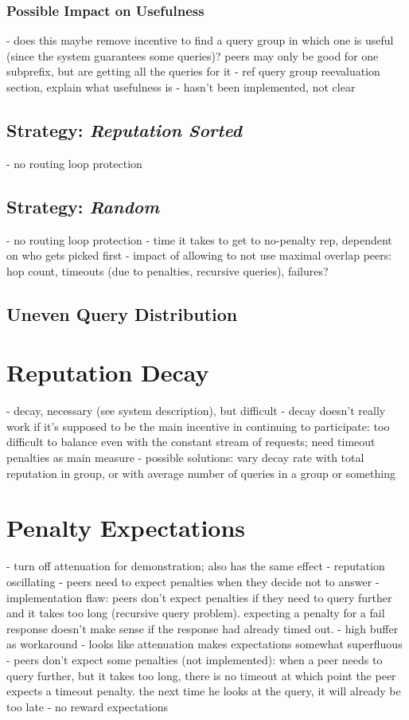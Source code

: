 \subsubsection{Possible Impact on Usefulness}
- does this maybe remove incentive to find a query group in which one is useful
  (since the system guarantees some queries)? peers may only be good for one
  subprefix, but are getting all the queries for it
- ref query group reevaluation section, explain what usefulness is
- hasn't been implemented, not clear

\subsection{Strategy: \emph{Reputation Sorted}}
- no routing loop protection
\subsection{Strategy: \emph{Random}}
- no routing loop protection
- time it takes to get to no-penalty rep, dependent on who gets picked first
- impact of allowing to not use maximal overlap peers: hop count, timeouts (due
  to penalties, recursive queries), failures?
\subsection{Uneven Query Distribution}

\section{Reputation Decay}
- decay, necessary (see system description), but difficult
- decay doesn't really work if it's supposed to be the main incentive in
  continuing to participate: too difficult to balance even with the constant
  stream of requests; need timeout penalties as main measure
- possible solutions: vary decay rate with total reputation in group, or with
  average number of queries in a group or something

\section{Penalty Expectations}
- turn off attenuation for demonstration; also has the same effect
- reputation oscillating
- peers need to expect penalties when they decide not to answer
- implementation flaw: peers don't expect penalties if they need to query
  further and it takes too long (recursive query problem). expecting a penalty
  for a fail response doesn't make sense if the response had already timed out.
- high buffer as workaround
- looks like attenuation makes expectations somewhat superfluous
- peers don't expect some penalties (not implemented): when a peer needs to
  query further, but it takes too long, there is no timeout at which point the
  peer expects a timeout penalty. the next time he looks at the query, it will
  already be too late
- no reward expectations

